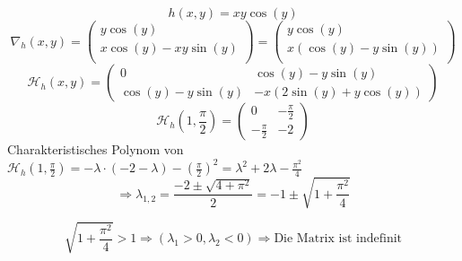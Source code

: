\documentclass[fleqn,13pt]{scrartcl}
\begin{document}
\begin{enumerate}
		\begin{equation*}
			h(x,y) = xy\cos(y)
		\end{equation*}
		\begin{equation*}
			\nabla_h(x,y) =
			\begin{pmatrix}
				y\cos(y)\\
				x\cos(y) - xy\sin(y)\\
			\end{pmatrix}
			=
			\begin{pmatrix}
				y\cos(y)\\
				x(\cos(y) - y\sin(y))\\
			\end{pmatrix}
		\end{equation*}
		\begin{equation*}
			\mathcal{H}_h(x,y) = 
			\begin{pmatrix}
				0 & \cos(y) - y\sin(y)\\
				\cos(y) - y\sin(y) & -x(2\sin(y) + y\cos(y))
			\end{pmatrix}
		\end{equation*}
		\begin{equation*}
			\mathcal{H}_h(1, \frac\pi2) = 
			\begin{pmatrix}
				0 & -\frac\pi2\\
				-\frac\pi2 & -2
			\end{pmatrix}
		\end{equation*}
		Charakteristisches Polynom von $\mathcal{H}_h(1, \frac\pi2) = -\lambda \cdot (-2 - \lambda) - (\frac\pi2)^2 = \lambda^2 +2\lambda - \frac{\pi^2}4$
		\begin{equation*}
			\Rightarrow \lambda_{1,2} = \frac{-2 \pm \sqrt{4 + \pi^2}}2 = -1 \pm \sqrt{1 + \frac{\pi^2}4}
		\end{equation*}

		\begin{equation*}
			\sqrt{1 + \frac{\pi^2}4} > 1 \Rightarrow (\lambda_1 > 0, \lambda_2 < 0) \Rightarrow \text{Die Matrix ist indefinit}
		\end{equation*}

\end{enumerate}
\end{document}
